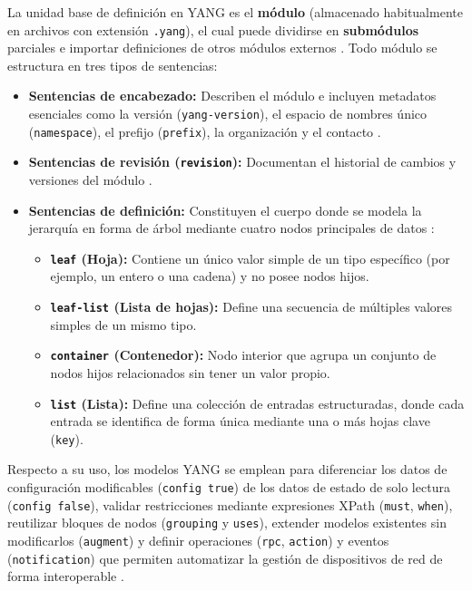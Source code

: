 \documentclass[12pt,a4paper]{article}
\begin{document}
La unidad base de definición en YANG es el \textbf{módulo} (almacenado habitualmente en archivos con extensión \texttt{.yang}), el cual puede dividirse en \textbf{submódulos} parciales e importar definiciones de otros módulos externos \parencite{bjorklund2016rfc7950}. Todo módulo se estructura en tres tipos de sentencias:

\begin{itemize}
    \item \textbf{Sentencias de encabezado:} Describen el módulo e incluyen metadatos esenciales como la versión (\texttt{yang-version}), el espacio de nombres único (\texttt{namespace}), el prefijo (\texttt{prefix}), la organización y el contacto \parencite{bjorklund2016rfc7950}.
    \item \textbf{Sentencias de revisión (\texttt{revision}):} Documentan el historial de cambios y versiones del módulo \parencite{bjorklund2016rfc7950}.
    \item \textbf{Sentencias de definición:} Constituyen el cuerpo donde se modela la jerarquía en forma de árbol mediante cuatro nodos principales de datos \parencite{bjorklund2016rfc7950}:
    \begin{itemize}
        \item \textbf{\texttt{leaf} (Hoja):} Contiene un único valor simple de un tipo específico (por ejemplo, un entero o una cadena) y no posee nodos hijos.
        \item \textbf{\texttt{leaf-list} (Lista de hojas):} Define una secuencia de múltiples valores simples de un mismo tipo.
        \item \textbf{\texttt{container} (Contenedor):} Nodo interior que agrupa un conjunto de nodos hijos relacionados sin tener un valor propio.
        \item \textbf{\texttt{list} (Lista):} Define una colección de entradas estructuradas, donde cada entrada se identifica de forma única mediante una o más hojas clave (\texttt{key}).
    \end{itemize}
\end{itemize}

Respecto a su uso, los modelos YANG se emplean para diferenciar los datos de configuración modificables (\texttt{config true}) de los datos de estado de solo lectura (\texttt{config false}), validar restricciones mediante expresiones XPath (\texttt{must}, \texttt{when}), reutilizar bloques de nodos (\texttt{grouping} y \texttt{uses}), extender modelos existentes sin modificarlos (\texttt{augment}) y definir operaciones (\texttt{rpc}, \texttt{action}) y eventos (\texttt{notification}) que permiten automatizar la gestión de dispositivos de red de forma interoperable \parencite{bjorklund2016rfc7950}.
\end{document}
